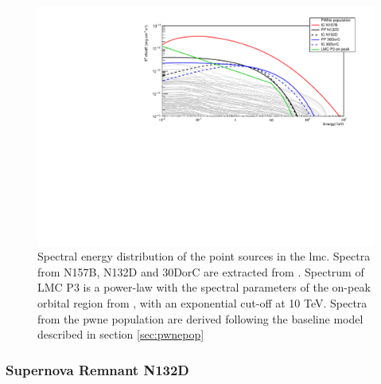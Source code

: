 \documentclass[main.tex]{subfiles}
\begin{document}
\begin{figure}
  \centering
  \includegraphics[width=\textwidth]{Pictures/pointsourcesspec.pdf}
  \caption{\label{fig:PS} Spectral energy distribution of the point sources in the \gls{lmc}. Spectra from N157B, N132D and 30DorC are extracted from \cite{2015HESSTeVLMC}. Spectrum of LMC P3 is a power-law with the spectral parameters of the on-peak orbital region from \cite{2017HESSLMCP3}, with an exponential cut-off at 10 TeV. Spectra from the \gls{pwne} population are derived following the baseline model described in section \ref{sec:pwnepop}}
\end{figure}

\subsubsection{Supernova Remnant N132D}
\end{document}
